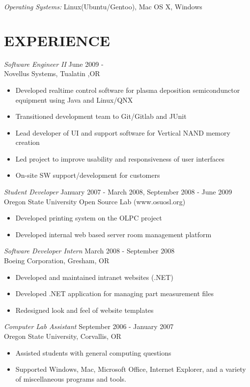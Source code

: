 \documentclass[margin]{res}
\begin{document}
\begin{resume}
		{\sl Operating Systems:} Linux(Ubuntu/Gentoo), Mac OS X, Windows
 
\section{EXPERIENCE} {\sl Software Engineer II} \hfill June 2009 -  \\
                Novellus Systems,  Tualatin ,OR 
                 \begin{itemize}  \itemsep -2pt %
                 \item Developed realtime control software for 
				 plasma deposition semicondunctor equipment using Java and Linux/QNX
                \item Transitioned development team to Git/Gitlab and JUnit 
                \item Lead developer of UI and support software for Vertical NAND memory creation 
				\item Led project to improve usability and responsiveness of user interfaces
				\item On-site SW support/development for customers
                \end{itemize}
 
                {\sl Student Developer} \hfill            January 2007 - March 2008, September 2008 - June 2009 \\
                Oregon State University Open Source Lab (www.osuosl.org)
                 \begin{itemize}  \itemsep -2pt %
                 \item Developed printing system on the OLPC project
				 \item Developed internal web based server room management platform
                 \end{itemize}

                {\sl Software Developer Intern} \hfill         March 2008 - September 2008\\
                Boeing Corporation, Gresham, OR
                  \begin{itemize}
                   \item Developed and maintained intranet websites (.NET)
				   \item Developed .NET application for managing part measurement files
				   \item Redesigned look and feel of website templates
                   \end{itemize} 
 
 				{\sl Computer Lab Assistant} \hfill         September 2006 - January 2007\\
                Oregon State University, Corvallis, OR
                  \begin{itemize}
                   \item Assisted students with general computing questions
				   \item Supported Windows, Mac, Microsoft Office, Internet Explorer, and a variety
				   of miscellaneous programs and tools.
                   \end{itemize} 
\end{resume}
\end{document}
